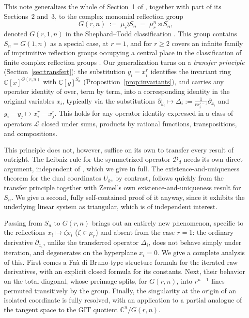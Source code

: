 \documentclass[10pt,a4paper]{amsart}
\newcommand{\CC}{\mathbb{C}}
\begin{document}
This note generalizes the whole of Section~1 of \cite{Ze}, together with part of its Sections~2 and~3, to the complex monomial reflection group
\[
G(r,n) \;:=\; \mu_r\wr S_n \;=\; \mu_r^n\rtimes S_n,
\]
denoted $G(r,1,n)$ in the Shephard--Todd classification \cite{ST}. This group contains $S_n=G(1,n)$ as a special case, at $r=1$, and for $r\ge2$ covers an infinite family of imprimitive reflection groups occupying a central place in the classification of finite complex reflection groups \cite{ST,Ch}. Our generalization turns on a \emph{transfer principle} (Section~\ref{sec:transfert}): the substitution $y_i=x_i^r$ identifies the invariant ring $\CC[x]^{G(r,n)}$ with $\CC[y]^{S_n}$ (Proposition~\ref{prop:invariants}), and carries any operator identity of \cite{Ze} over, term by term, into a corresponding identity in the original variables $x_i$, typically via the substitutions $\partial_{y_i}\mapsto\Delta_i:=\frac{1}{rx_i^{r-1}}\partial_{x_i}$ and $y_i-y_j\mapsto x_i^r-x_j^r$. This holds for any operator identity expressed in a class of operators $\mathcal L$ closed under sums, products by rational functions, transpositions, and compositions.

This principle does not, however, suffice on its own to transfer every result of \cite{Ze} outright. The Leibniz rule for the symmetrized operator $\mathcal D_d$ needs its own direct argument, independent of \cite{Ze}, which we give in full. The existence-and-uniqueness theorem for the dual coordinates $U_k$, by contrast, follows quickly from the transfer principle together with Zemel's own existence-and-uniqueness result for $S_n$. We give a second, fully self-contained proof of it anyway, since it exhibits the underlying linear system as triangular, which is of independent interest.

Passing from $S_n$ to $G(r,n)$ brings out an entirely new phenomenon, specific to the reflections $x_i\mapsto\zeta x_i$ ($\zeta\in\mu_r$) and absent from the case $r=1$: the ordinary derivative $\partial_{x_i}$, unlike the transferred operator $\Delta_i$, does not behave simply under iteration, and degenerates on the hyperplane $x_i=0$. We give a complete analysis of this. First comes a Faà di Bruno-type structure formula for the iterated raw derivatives, with an explicit closed formula for its constants. Next, their behavior on the total diagonal, whose preimage splits, for $G(r,n)$, into $r^{n-1}$ lines permuted transitively by the group. Finally, the singularity at the origin of an isolated coordinate is fully resolved, with an application to a partial analogue of the tangent space to the GIT quotient $\CC^n/G(r,n)$.
\end{document}
